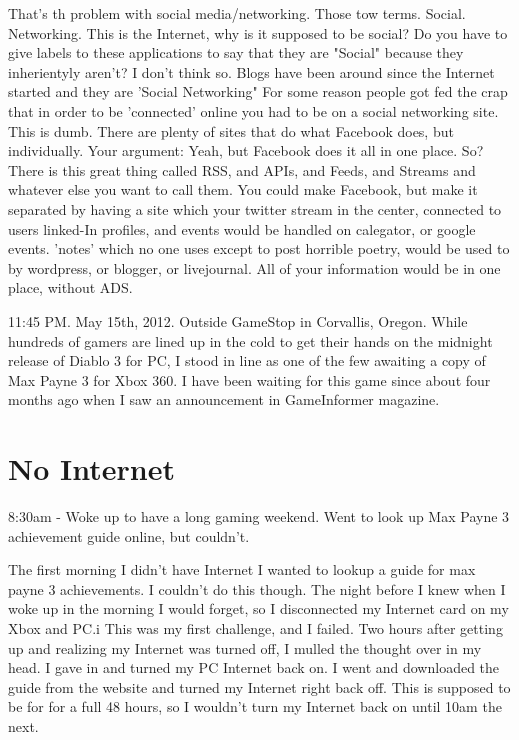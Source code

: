 \documentclass[12pt,letterpaper]{article}
\begin{document}
That's th problem with social media/networking. Those tow terms.
Social. Networking. This is the Internet, why is it supposed to be
social? Do you have to give labels to these applications to say that they
are "Social" because they inherientyly aren't? I don't think so. Blogs
have been around since the Internet started and they are 'Social
Networking" For some reason people got fed the crap that in order to be
'connected' online you had to be on a social networking site. This is
dumb. There are plenty of sites that do what Facebook does, but
individually. Your argument: Yeah, but Facebook does it all in one
place. So? There is this great thing called RSS, and APIs, and Feeds,
and Streams and whatever else you want to call them. You could make
Facebook, but make it separated by having a site which your twitter
stream in the center, connected to users linked-In profiles, and events
would be handled on calegator, or google events. 'notes' which no one
uses except to post horrible poetry, would be used to by wordpress, or
blogger, or livejournal.  All of your information would be in one place,
without ADS.


11:45 PM. May 15th, 2012. Outside GameStop in Corvallis, Oregon. While hundreds of gamers are lined up
in the cold to get their hands on the midnight release of Diablo 3 for
PC, I stood in line as one of the few awaiting a copy of Max Payne 3 for
Xbox 360. I have been waiting for this game since about four months ago
when I saw an announcement in GameInformer magazine. 


\section{No Internet}
8:30am - Woke up to have a long gaming weekend. Went to look up Max
Payne 3 achievement guide online, but couldn't.

The first morning I didn't have Internet I wanted to lookup a guide for
max payne 3 achievements. I couldn't do this though. The night before I
knew when I woke up in the morning I would forget, so I disconnected my
Internet card on my Xbox and PC.i This was my first challenge, and I
failed. Two hours after getting up and realizing my Internet was turned
off, I mulled the thought over in my head.  I gave in and turned my PC
Internet back on. I went and downloaded the guide from the website and
turned my Internet right back off. This is supposed to be for for a full
48 hours, so I wouldn't turn my Internet back on until 10am the next.
\end{document}
